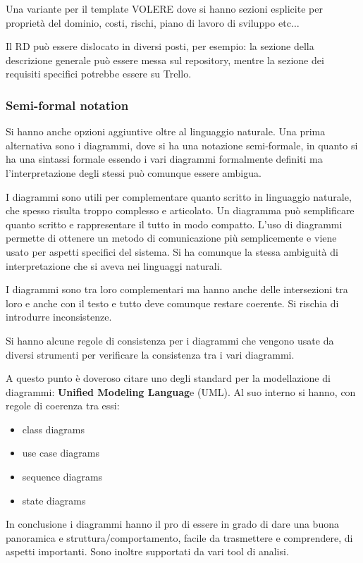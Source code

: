 Una variante per il template VOLERE dove si hanno sezioni esplicite per proprietà
del dominio, costi, rischi, piano di lavoro di sviluppo etc$\dots$

Il RD può essere dislocato in diversi posti, per esempio: la sezione della
descrizione generale può essere messa sul repository, mentre la sezione dei
requisiti specifici potrebbe essere su Trello.

\subsubsection{Semi-formal notation}
Si hanno anche opzioni aggiuntive oltre al linguaggio naturale. Una prima alternativa
sono i diagrammi, dove si ha una notazione semi-formale, in quanto si ha una sintassi
formale essendo i vari diagrammi formalmente definiti ma l'interpretazione degli
stessi può comunque essere ambigua.

I diagrammi sono utili per complementare quanto scritto in linguaggio naturale, che
spesso risulta troppo complesso e articolato. Un diagramma può semplificare quanto
scritto e rappresentare il tutto in modo compatto. L'uso di diagrammi permette
di ottenere un metodo di comunicazione più semplicemente e viene usato per aspetti
specifici del sistema. Si ha comunque la stessa ambiguità di interpretazione
che si aveva nei linguaggi naturali.

I diagrammi sono tra loro complementari ma hanno anche delle intersezioni tra
loro e anche con il testo e tutto deve comunque restare coerente. Si rischia di
introdurre inconsistenze.

Si hanno alcune regole di consistenza per i diagrammi che vengono usate da diversi
strumenti per verificare la consistenza tra i vari diagrammi.

A questo punto è doveroso citare uno degli standard per la modellazione di
diagrammi: \textbf{Unified Modeling Languag}e (UML). Al suo interno si hanno, con
regole di coerenza tra essi:
\begin{itemize}
      \item class diagrams
      \item use case diagrams
      \item sequence diagrams
      \item state diagrams
\end{itemize}

In conclusione i diagrammi hanno il pro di essere in grado di dare una buona panoramica
e struttura/comportamento, facile da trasmettere e comprendere, di aspetti importanti.
Sono inoltre supportati da vari tool di analisi.

